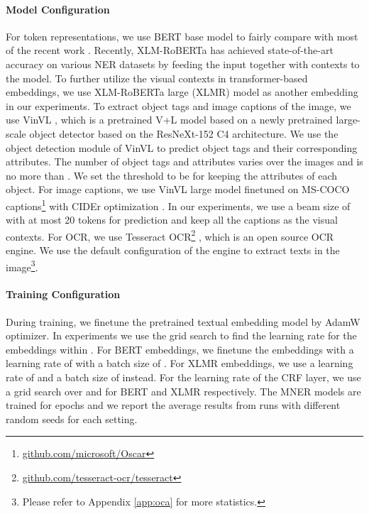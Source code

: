 \documentclass[11pt]{article}
\begin{document}
\paragraph{Model Configuration}
For token representations, we use BERT base model to fairly compare with most of the recent work \citep{yu-etal-2020-improving-multimodal,zhang2021multi,Sun2021RpBERTAT}. Recently, XLM-RoBERTa has achieved state-of-the-art accuracy on various NER datasets by feeding the input together with contexts to the model. To further utilize the visual contexts in transformer-based embeddings, we use XLM-RoBERTa large (XLMR) model as another embedding in our experiments. 
To extract object tags and image captions of the image, we use VinVL \citep{zhang2021vinvl}, which is a pretrained V+L model based on a newly pretrained large-scale object detector based on the ResNeXt-152 C4 architecture. We use the object detection module of VinVL to predict object tags and their corresponding attributes. The number of object tags and attributes varies over the images and is no more than . We set the threshold  to be  for keeping the attributes of each object. For image captions, we use VinVL large model finetuned on MS-COCO \citep{lin2014microsoft} captions\footnote{\url{github.com/microsoft/Oscar}} with CIDEr optimization \citep{rennie2017self}. In our experiments, we use a beam size of  with at most 20 tokens for prediction and keep all the  captions as the visual contexts. For OCR, we use Tesseract OCR\footnote{\url{github.com/tesseract-ocr/tesseract}} \citep{smith2007overview}, which is an open source OCR engine. We use the default configuration of the engine to extract texts in the image\footnote{Please refer to Appendix \ref{app:oca} for more statistics.}.

\paragraph{Training Configuration}
During training, we finetune the pretrained textual embedding model by AdamW \citep{loshchilov2018decoupled} optimizer. In experiments we use the grid search to find the learning rate for the embeddings within . For BERT embeddings, we finetune the embeddings with a learning rate of  with a batch size of . For XLMR embeddings, we use a learning rate of  and a batch size of  instead. For the learning rate of the CRF layer, we use a grid search over  and  for BERT and XLMR respectively. The MNER models are trained for  epochs and we report the average results from  runs with different random seeds for each setting.
\end{document}
